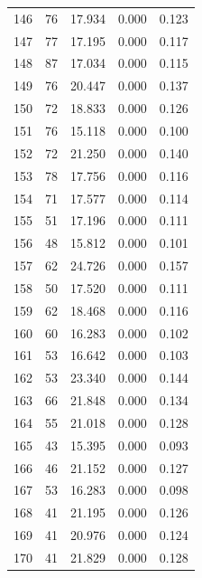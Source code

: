 \begin{table}
\begin{tabular}{rrrrr}
 146 &     76 &         17.934 &        0.000 &           0.123 \\
 147 &     77 &         17.195 &        0.000 &           0.117 \\
 148 &     87 &         17.034 &        0.000 &           0.115 \\
 149 &     76 &         20.447 &        0.000 &           0.137 \\
 150 &     72 &         18.833 &        0.000 &           0.126 \\
 151 &     76 &         15.118 &        0.000 &           0.100 \\
 152 &     72 &         21.250 &        0.000 &           0.140 \\
 153 &     78 &         17.756 &        0.000 &           0.116 \\
 154 &     71 &         17.577 &        0.000 &           0.114 \\
 155 &     51 &         17.196 &        0.000 &           0.111 \\
 156 &     48 &         15.812 &        0.000 &           0.101 \\
 157 &     62 &         24.726 &        0.000 &           0.157 \\
 158 &     50 &         17.520 &        0.000 &           0.111 \\
 159 &     62 &         18.468 &        0.000 &           0.116 \\
 160 &     60 &         16.283 &        0.000 &           0.102 \\
 161 &     53 &         16.642 &        0.000 &           0.103 \\
 162 &     53 &         23.340 &        0.000 &           0.144 \\
 163 &     66 &         21.848 &        0.000 &           0.134 \\
 164 &     55 &         21.018 &        0.000 &           0.128 \\
 165 &     43 &         15.395 &        0.000 &           0.093 \\
 166 &     46 &         21.152 &        0.000 &           0.127 \\
 167 &     53 &         16.283 &        0.000 &           0.098 \\
 168 &     41 &         21.195 &        0.000 &           0.126 \\
 169 &     41 &         20.976 &        0.000 &           0.124 \\
 170 &     41 &         21.829 &        0.000 &           0.128 \\

\end{tabular}
\end{table}
